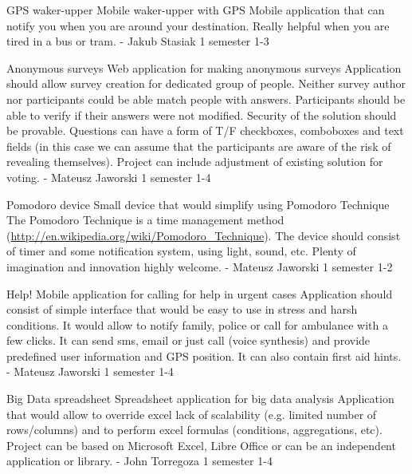 \begin{project}
{GPS waker-upper}
{Mobile waker-upper with GPS}
{
Mobile application that can notify you when you are around your destination.
Really helpful when you are tired in a bus or tram.
}
{-}
{Jakub Stasiak}
{1 semester}
{1-3}
\end{project}
\begin{project}
{Anonymous surveys}
{Web application for making anonymous surveys}
{
Application should allow survey creation for dedicated group of people. 
Neither survey author nor participants could be able match people with answers.
Participants should be able to verify if their answers were not modified. 
Security of the solution should be provable. Questions can have a form of T/F
checkboxes, comboboxes and text fields (in this case we can assume that the
participants are aware of the risk of revealing themselves). Project can include
adjustment of existing solution for voting.
}
{-}
{Mateusz Jaworski}
{1 semester}
{1-4}
\end{project}
\begin{project}
{Pomodoro device}
{Small device that would simplify using Pomodoro Technique} 
{ 
The Pomodoro Technique is a time management method
(\url{http://en.wikipedia.org/wiki/Pomodoro\_Technique}). The device should
consist of timer and some notification system, using light, sound, etc. Plenty
of imagination and innovation highly welcome.
}
{-} {Mateusz Jaworski}
{1 semester}
{1-2}
\end{project}
\begin{project}
{Help!}
{Mobile application for calling for help in urgent cases} 
{ 
Application should consist of simple interface that would be easy to use in
stress and harsh conditions. It would allow to notify family, police or call for
ambulance with a few clicks. It can send sms, email or just call (voice
synthesis) and provide predefined user information and GPS position. It can also
contain first aid hints.
} {-}
{Mateusz Jaworski} {1 semester} {1-4}
\end{project}
\begin{project}
{Big Data spreadsheet}
{Spreadsheet application for big data analysis} 
{ 
Application that would allow to override excel lack of scalability (e.g. limited
number of rows/columns) and to perform excel formulas (conditions, aggregations,
etc). Project can be based on Microsoft Excel, Libre Office or can be an
independent application or library.
} 
{-}
{John Torregoza}
{1 semester}
{1-4}
\end{project}
